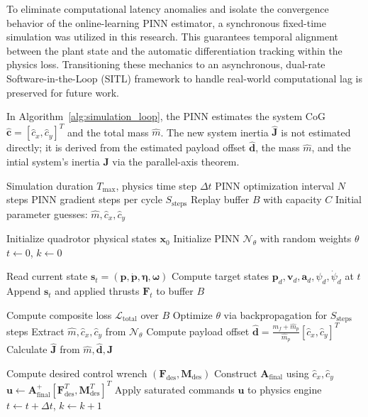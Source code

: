 To eliminate computational latency anomalies and isolate the convergence behavior of the online-learning PINN estimator, a synchronous fixed-time simulation was utilized in this research. This guarantees temporal alignment between the plant state and the automatic differentiation tracking within the physics loss. Transitioning these mechanics to an asynchronous, dual-rate Software-in-the-Loop (SITL) framework to handle real-world computational lag is preserved for future work.

In Algorithm~\ref{alg:simulation_loop}, the PINN estimates the system CoG
$\hat{\mathbf{c}} = [\hat{c}_x, \hat{c}_y]^T$ and the total mass $\hat{m}$.
The new system inertia $\hat{\mathbf{J}}$ is not estimated directly; it is derived from the estimated payload offset $\hat{\mathbf{d}}$, the mass $\hat{m}$, and the intial system's inertia $\mathbf{J}$ via the parallel-axis theorem.

\begin{algorithm}[htbp]
\caption{Fixed Time-step Online Parameter Estimation}
\label{alg:simulation_loop}
\begin{algorithmic}[1]
\Require Simulation duration $T_{\max}$, physics time step $\Delta t$
\Require PINN optimization interval $N$ steps
\Require PINN gradient steps per cycle $S_{\text{steps}}$
\Require Replay buffer $B$ with capacity $C$
\Require Initial parameter guesses: $\hat{m}, \hat{c}_x, \hat{c}_y$

\State Initialize quadrotor physical states $\mathbf{x}_0$
\State Initialize PINN $\mathcal{N}_\theta$ with random weights $\theta$
\State $t \gets 0$, \quad $k \gets 0$

    \State Read current state $\mathbf{s}_t = (\mathbf{p}, \dot{\mathbf{p}}, \boldsymbol{\eta}, \boldsymbol{\omega})$
    \State Compute target states $\mathbf{p}_d, \mathbf{v}_d, \mathbf{a}_d, \psi_d, \dot{\psi}_d$ at $t$
    \State Append $\mathbf{s}_t$ and applied thrusts $\mathbf{F}_t$ to buffer $B$

        \State Compute composite loss $\mathcal{L}_{\text{total}}$ over $B$
        \State Optimize $\theta$ via backpropagation for $S_{\text{steps}}$ steps
        \State Extract $\hat{m}, \hat{c}_x, \hat{c}_y$ from $\mathcal{N}_\theta$
        \State Compute payload offset $\hat{\mathbf{d}} = \frac{m_f + \hat{m}_p}{\hat{m}_p}[\hat{c}_x, \hat{c}_y]^T$
        \State Calculate $\hat{\mathbf{J}}$ from $\hat{m}, \hat{\mathbf{d}}, \mathbf{J}$
    \EndIf

    \State Compute desired control wrench $(\mathbf{F}_{\text{des}}, \mathbf{M}_{\text{des}})$
    \State Construct $\mathbf{A}_{\text{final}}$ using $\hat{c}_x, \hat{c}_y$
    \State $\mathbf{u} \gets \mathbf{A}_{\text{final}}^{+} [\mathbf{F}_{\text{des}}^T, \mathbf{M}_{\text{des}}^T]^T$
    \State Apply saturated commands $\mathbf{u}$ to physics engine
    \State $t \gets t + \Delta t$, \quad $k \gets k + 1$
\EndWhile
\end{algorithmic}
\end{algorithm}